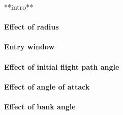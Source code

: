 **intro**

\paragraph{Effect of radius}

\paragraph{Entry window}

\paragraph{Effect of initial flight path angle}

\paragraph{Effect of angle of attack}

\paragraph{Effect of bank angle}



